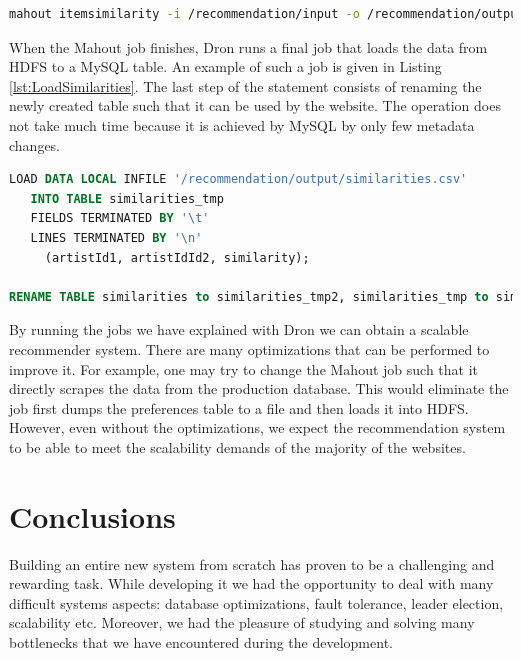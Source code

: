 \documentclass[11pt,a4paper,twoside]{report}
\begin{document}
\begin{lstlisting}[language=bash, caption={Unix command starting the ItemSimilarity Mahout job}, label={lst:MahoutJob}]
mahout itemsimilarity -i /recommendation/input -o /recommendation/output -s SIMILARITY_LOGLIKELIHOOD -m 10 --tempDir /tmp/tmp
\end{lstlisting}


When the Mahout job finishes, Dron runs a final job that loads the data from HDFS to a MySQL table. An example of such a job is given in Listing \ref{lst:LoadSimilarities}. The last step of the statement consists of renaming the newly created table such that it can be used by the website. The operation does not take much time because it is achieved by MySQL by only few metadata changes.
\newpage

\begin{lstlisting}[language=SQL, caption={MySQL query that loads data into the similarities table}, label={lst:LoadSimilarities}]
 LOAD DATA LOCAL INFILE '/recommendation/output/similarities.csv'
   INTO TABLE similarities_tmp
   FIELDS TERMINATED BY '\t'
   LINES TERMINATED BY '\n'
     (artistId1, artistIdId2, similarity);

RENAME TABLE similarities to similarities_tmp2, similarities_tmp to similarities;
\end{lstlisting}


By running the jobs we have explained with Dron we can obtain a scalable recommender system. There are many optimizations that can be performed to improve it. For example, one may try to change the Mahout job such that it directly scrapes the data from the production database. This would eliminate the job first dumps the preferences table to a file and then loads it into HDFS. However, even without the optimizations, we expect the recommendation system to be able to meet the scalability demands of the majority of the websites.


\chapter{Conclusions}

Building an entire new system from scratch has proven to be a challenging and rewarding task. While developing it we had the opportunity to deal with many difficult systems aspects: database optimizations, fault tolerance, leader election, scalability etc. Moreover, we had the pleasure of studying and solving many bottlenecks that we have encountered during the development.
\end{document}
